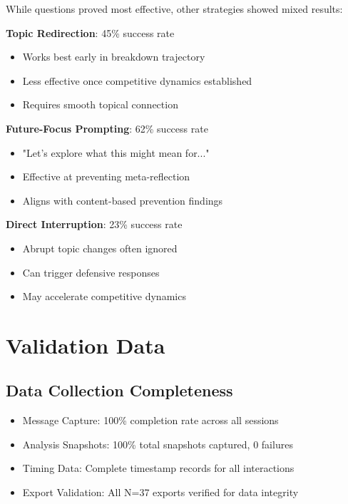 \documentclass[11pt,letterpaper]{article}
\newcommand{\exponedataTotalSessionsRaw}{37}
\newcommand{\exponedataTotalSessions}{N=\exponedataTotalSessionsRaw}
\begin{document}
While questions proved most effective, other strategies showed mixed results:

\textbf{Topic Redirection}: 45\% success rate
\begin{itemize}
    \item Works best early in breakdown trajectory
    \item Less effective once competitive dynamics established
    \item Requires smooth topical connection
\end{itemize}

\textbf{Future-Focus Prompting}: 62\% success rate
\begin{itemize}
    \item "Let's explore what this might mean for..."
    \item Effective at preventing meta-reflection
    \item Aligns with content-based prevention findings
\end{itemize}

\textbf{Direct Interruption}: 23\% success rate
\begin{itemize}
    \item Abrupt topic changes often ignored
    \item Can trigger defensive responses
    \item May accelerate competitive dynamics
\end{itemize}

\section{Validation Data}
\label{app:performance}

\subsection{Data Collection Completeness}

\begin{itemize}
    \item Message Capture: 100\% completion rate across all sessions
    \item Analysis Snapshots: 100\% total snapshots captured, 0 failures
    \item Timing Data: Complete timestamp records for all interactions
    \item Export Validation: All \exponedataTotalSessions{} exports verified for data integrity
\end{itemize}
\end{document}

